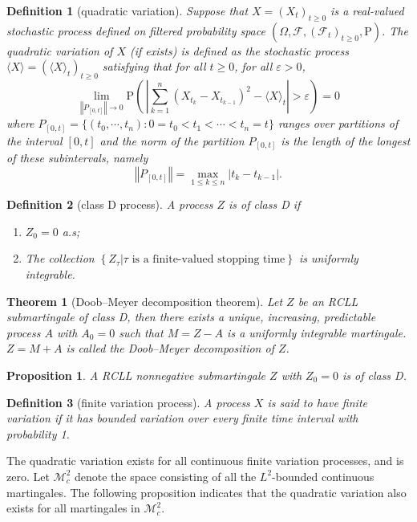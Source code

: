 \documentclass{report}
\newtheorem{definition}{Definition}[section]
\newtheorem{proposition}{Proposition}[section]
\newtheorem{theorem}{Theorem}[section]
\theoremstyle{nonumberplain}
\begin{document}
\begin{definition}[quadratic variation]	
	Suppose that $X=(X_t)_{t\ge 0}$ is a real-valued stochastic process defined on filtered probability space $(\Omega,\mathcal{F},(\mathcal{F}_{t})_{t\ge0},\mathrm{P})$. The \emph{quadratic variation} of $X$ (if exists) is defined as the stochastic process $\langle X\rangle=(\langle X\rangle_{t})_{t\ge0}$ satisfying that for all $t\ge0$, for all $\varepsilon>0$,
	\[
	\lim_{\left\Vert P_{[0,t]}\right\Vert \rightarrow 0}\mathrm{P}\left(\,\left|\sum _{k=1}^{n}(X_{t_{k}}-X_{t_{k-1}})^{2}-\langle X\rangle_{t}\right|>\varepsilon\right)=0
	\] 
	where $P_{[0,t]}=\{(t_0,\cdots,t_n):0=t_0<t_1<\cdots<t_n=t\}$ ranges over partitions of the interval $[0,t]$ and the norm of the partition $P_{[0,t]}$ is the length of the longest of these subintervals, namely
	\[
	\left\Vert P_{[0,t]}\right\Vert=\max\limits_{1\le k\le n}{|t_k-t_{k-1}|}.
	\]
\end{definition}

\begin{definition}[class D process]
	A process $Z$ is of \emph{class D} if 
	\begin{enumerate}
		\item $Z_0=0$ a.s;
		\item The collection $\left\{Z_{\tau}| \tau \text { is a finite-valued stopping time}\right\}$ is uniformly integrable.
	\end{enumerate}
\end{definition}

\begin{theorem}[Doob–Meyer decomposition theorem]\label{DM}
Let $Z$ be an RCLL submartingale of class D, then there exists a unique, increasing, predictable process $A$ with $A_{0}=0$ such that $M=Z-A$ is a uniformly integrable martingale. $Z=M+A$ is called the Doob–Meyer decomposition of $Z$.
\end{theorem}

\begin{proposition}
	A RCLL nonnegative submartingale $Z$ with $Z_0=0$ is of class D.
\end{proposition}

\begin{definition}[finite variation process]	
	A process $X$ is said to have \emph{finite variation} if it has bounded variation over every finite time interval with probability 1.	
\end{definition}	

The quadratic variation exists for all continuous finite variation processes, and is zero. Let $\mathscr{M}_c^2$ denote the space consisting of all the $L^2$-bounded continuous martingales. The following proposition indicates that the quadratic variation also exists for all martingales in $\mathscr{M}_c^2$.
 
\end{document}
